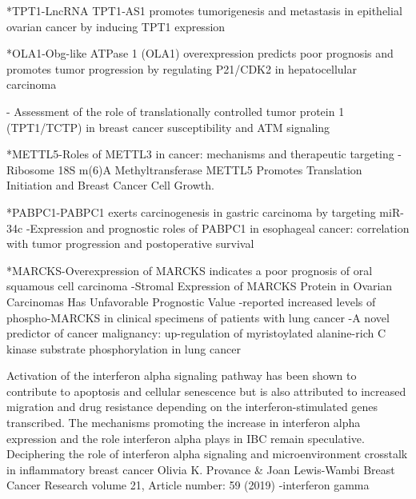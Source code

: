 *TPT1-LncRNA TPT1‐AS1 promotes tumorigenesis and metastasis in epithelial ovarian cancer by inducing TPT1 expression

*OLA1-Obg-like ATPase 1 (OLA1) overexpression predicts poor prognosis and promotes tumor progression by regulating P21/CDK2 in hepatocellular carcinoma

- Assessment of the role of translationally controlled tumor protein 1 (TPT1/TCTP) in breast cancer susceptibility and ATM signaling

*METTL5-Roles of METTL3 in cancer: mechanisms and therapeutic targeting
- Ribosome 18S m(6)A Methyltransferase METTL5 Promotes Translation Initiation and Breast Cancer Cell Growth.

*PABPC1-PABPC1 exerts carcinogenesis in gastric carcinoma by targeting miR-34c
-Expression and prognostic roles of PABPC1 in esophageal cancer: correlation with tumor progression and postoperative survival

*MARCKS-Overexpression of MARCKS indicates a poor prognosis of oral squamous cell carcinoma
-Stromal Expression of MARCKS Protein in Ovarian
Carcinomas Has Unfavorable Prognostic Value
-reported increased levels of phospho-MARCKS in clinical specimens of patients with lung cancer
-A novel predictor of cancer malignancy: up-regulation of myristoylated alanine-rich C kinase substrate phosphorylation in lung cancer

Activation of the interferon alpha signaling pathway has been shown to contribute to apoptosis and cellular senescence but is also attributed to increased migration and drug resistance depending on the interferon-stimulated genes transcribed. The mechanisms promoting the increase in interferon alpha expression and the role interferon alpha plays in IBC remain speculative. Deciphering the role of interferon alpha signaling and microenvironment crosstalk in inflammatory breast cancer
Olivia K. Provance & Joan Lewis-Wambi 
Breast Cancer Research volume 21, Article number: 59 (2019) 
\cite{provance2019deciphering}
\cite{mojic2018dark}-interferon gamma










 

